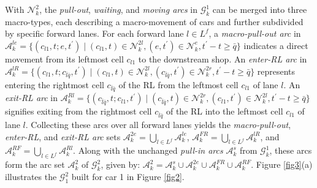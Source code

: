 \documentclass[12pt]{article}
\begin{document}
With $\mathcal{N}^2_k$, the \textit{pull-out}, \textit{waiting}, and \textit{moving arcs} in $\mathcal{G}^1_k$ can be merged into three macro-types, each describing a macro-movement of cars and further subdivided by specific forward lanes. %
For each forward lane $l\in L^f$, a \textit{macro-pull-out arc} in $\mathcal{A}^{le}_k=\{(c_{l1},t;e,t^{\prime})\mid (c_{l1},t)\in \mathcal{N}^{2l}_k,(e,t^{\prime})\in \mathcal{N}^e_k, t^{\prime}-t\geqslant\bar{q}\}$ indicates a direct movement from its leftmost cell $c_{l1}$ to the downstream shop. An \textit{enter-RL arc} in $\mathcal{A}^{lR}_k=\{(c_{l1},t;c_{\bar{l}\bar{q}},t^{\prime})\mid (c_{l1},t)\in \mathcal{N}^{2l}_k, (c_{\bar{l}\bar{q}},t^{\prime})\in \mathcal{N}^{2r}_k, t^{\prime}-t\geqslant \bar{q} \}$ represents entering the rightmost cell $c_{\bar{l}\bar{q}}$ of the RL from the leftmost cell $c_{l1}$ of lane $l$. An \textit{exit-RL arc} in $\mathcal{A}^{Rl}_k=\{(c_{\bar{l}\bar{q}},t;c_{l1},t^{\prime})\mid (c_{\bar{l}\bar{q}},t)\in \mathcal{N}^{2r}_k, (c_{l1},t^{\prime})\in \mathcal{N}^{2l}_k, t^{\prime}-t\geqslant \bar{q}\}$ signifies exiting from the rightmost cell $c_{\bar{l}\bar{q}}$ of the RL into the leftmost cell $c_{l1}$ of lane $l$. Collecting these arcs over all forward lanes yields the \textit{macro-pull-out}, \textit{enter-RL}, and \textit{exit-RL arc} sets $\mathcal{A}^{2e}_k=\bigcup_{l\in L^f}{\mathcal{A}^{le}_k}$, $\mathcal{A}^{FR}_k=\bigcup_{l\in L^f}{\mathcal{A}^{lR}_k}$, and $\mathcal{A}^{RF}_k=\bigcup_{l\in L^f}{\mathcal{A}^{Rl}_k}$. %
Along with the unchanged \textit{pull-in arcs} $\mathcal{A}^{s}_k$ from $\mathcal{G}^1_k$, these arcs form the arc set $\mathcal{A}^2_k$ of $\mathcal{G}^2_k$, given by: $\mathcal{A}^{2}_k=\mathcal{A}^{s}_k\cup \mathcal{A}^{2e}_k\cup \mathcal{A}^{FR}_k\cup \mathcal{A}^{RF}_k$. Figure \ref{fig3}(a) illustrates the $\mathcal{G}^2_1$ built for car 1 in Figure \ref{fig2}.





\end{document}
